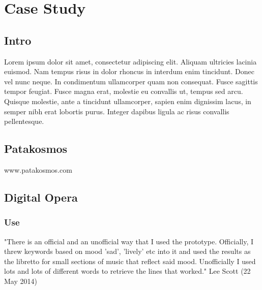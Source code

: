 
\pagestyle{fancy}

\chapter{Case Study}
\label{CaseStudy}


\section{Intro}

Lorem ipsum dolor sit amet, consectetur adipiscing elit. Aliquam ultricies lacinia euismod. Nam tempus risus in dolor rhoncus in interdum enim tincidunt. Donec vel nunc neque. In condimentum ullamcorper quam non consequat. Fusce sagittis tempor feugiat. Fusce magna erat, molestie eu convallis ut, tempus sed arcu. Quisque molestie, ante a tincidunt ullamcorper, sapien enim dignissim lacus, in semper nibh erat lobortis purus. Integer dapibus ligula ac risus convallis pellentesque.


\section{Patakosmos}

www.patakosmos.com


\section{Digital Opera}


\subsection{Use}

"There is an official and an unofficial way that I used the prototype. Officially, I threw keywords based on mood 'sad', 'lively' etc into it and used the results as the libretto for small sections of music that reflect said mood. Unofficially I used lots and lots of different words to retrieve the lines that worked." Lee Scott (22 May 2014)


